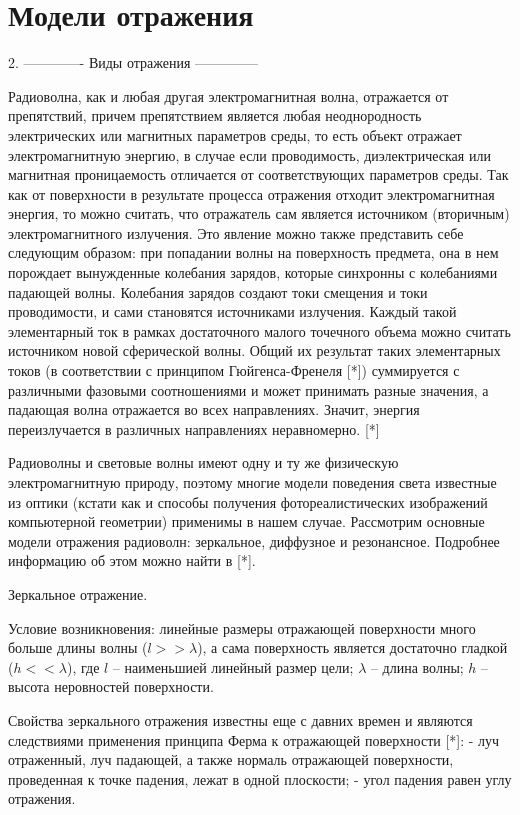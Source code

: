 \section*{Модели отражения} 

2. ------------- Виды отражения --------------

Радиоволна, как и любая другая электромагнитная волна, отражается от препятствий, причем препятствием является любая неоднородность электрических или магнитных параметров среды, то есть объект отражает электромагнитную энергию, в случае если проводимость, диэлектрическая или магнитная проницаемость отличается от соответствующих параметров среды.
Так как от поверхности в результате процесса отражения отходит электромагнитная энергия, то можно считать, что отражатель сам является источником (вторичным) электромагнитного излучения. Это явление можно также представить себе следующим образом: при попадании волны на поверхность предмета, она в нем порождает вынужденные колебания зарядов, которые синхронны с колебаниями падающей волны. Колебания зарядов создают токи смещения и токи проводимости, и сами становятся источниками излучения. Каждый такой элементарный ток в рамках достаточного малого точечного объема можно считать источником новой сферической волны. Общий их результат таких элементарных токов (в соответствии с принципом Гюйгенса-Френеля [*]) суммируется с различными фазовыми соотношениями и может принимать разные значения, а падающая волна отражается во всех направлениях. Значит, энергия переизлучается в различных направлениях неравномерно. [*]  

Радиоволны и световые волны имеют одну и ту же физическую электромагнитную природу, поэтому многие модели поведения света известные из оптики (кстати как и способы получения фотореалистических изображений компьютерной геометрии) применимы в нашем случае. Рассмотрим основные модели отражения радиоволн: зеркальное, диффузное и резонансное. Подробнее информацию об этом можно найти в [*].

Зеркальное отражение.

Условие возникновения: линейные размеры отражающей поверхности много больше длины волны ($ l >> \lambda $), а сама поверхность является достаточно гладкой ($ h << \lambda $), где $ l $ -- наименьшией линейный размер цели; $ \lambda $ -- длина волны; $ h $ -- высота неровностей поверхности. 

Свойства зеркального отражения известны еще с давних времен и являются следствиями применения принципа Ферма к отражающей поверхности  [*]:
- луч отраженный, луч падающей, а также нормаль отражающей поверхности, проведенная к точке падения, лежат в одной плоскости;
- угол падения равен углу отражения.


